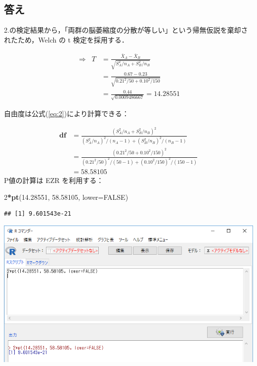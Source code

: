\documentclass[11pt,]{problemset}
\newenvironment{Shaded}{\begin{snugshade}}{\end{snugshade}}
\newcommand{\DataTypeTok}[1]{\textcolor[rgb]{0.13,0.29,0.53}{#1}}
\newcommand{\DecValTok}[1]{\textcolor[rgb]{0.00,0.00,0.81}{#1}}
\newcommand{\FloatTok}[1]{\textcolor[rgb]{0.00,0.00,0.81}{#1}}
\newcommand{\KeywordTok}[1]{\textcolor[rgb]{0.13,0.29,0.53}{\textbf{#1}}}
\newcommand{\NormalTok}[1]{#1}
\newcommand{\OperatorTok}[1]{\textcolor[rgb]{0.81,0.36,0.00}{\textbf{#1}}}
\newcommand{\OtherTok}[1]{\textcolor[rgb]{0.56,0.35,0.01}{#1}}
\begin{document}
\hypertarget{section-3}{%
\subsection{答え}\label{section-3}}

2.の検定結果から，「両群の脳萎縮度の分散が等しい」という帰無仮説を棄却されたため，Welch
の t 検定を採用する．

\[
\begin{aligned}
\Rightarrow\;\; T & = \frac{\bar{X}_A - \bar{X}_B}{\sqrt{S^2_A/n_A + S^2_B/n_B}} \\ 
                  & = \frac{0.67 - 0.23}{\sqrt{0.21^2/50 + 0.10^2/150}} \\ 
                  & = \frac{0.44}{\sqrt{0.0009486667}} = 14.28551
\end{aligned}
\]

自由度は公式(\ref{eq:2})により計算できる：

\[
\begin{aligned}
\mathbf{df} & = \frac{(S^2_A/n_A + S^2_B/n_B)^2}{(S_A^2/n_A)^2/(n_A-1)+(S_B^2/n_B)^2/(n_B-1)} \\
            & = \frac{(0.21^2/50 + 0.10^2/150)^2}{(0.21^2/50)^2/(50-1)+(0.10^2/150)^2/(150-1)} \\
            & = 58.58105
\end{aligned}
\] P値の計算は EZR を利用する：

\begin{Shaded}
\begin{Highlighting}[]
\DecValTok{2}\OperatorTok{*}\KeywordTok{pt}\NormalTok{(}\FloatTok{14.28551}\NormalTok{, }\FloatTok{58.58105}\NormalTok{, }\DataTypeTok{lower=}\OtherTok{FALSE}\NormalTok{)}
\end{Highlighting}
\end{Shaded}

\begin{verbatim}
## [1] 9.601543e-21
\end{verbatim}

\begin{center}\includegraphics[width=0.9\linewidth]{pic/tvaluepvalue01} \end{center}
\bigskip
\end{document}
